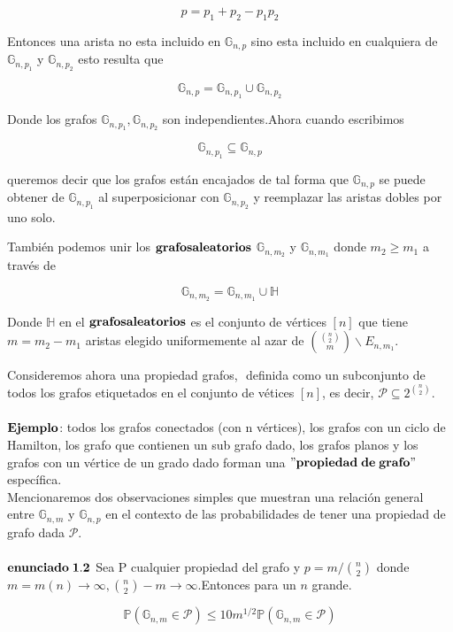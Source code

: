 \documentclass[11pt,a4paper]{article}
\begin{document}
  $$p= p_1 +p_2 -p_1p_2$$

Entonces una arista no esta incluido en $\mathbb{G}_{n,p}$ sino esta incluido en cualquiera de $\mathbb{G}_{n,p_1}$ y $\mathbb{G}_{n,p_2}$ esto resulta que

$$\mathbb{G}_{n,p} =\mathbb{G}_{n,p_1}\cup \mathbb{G}_{n,p_2}$$

Donde los grafos $\mathbb{G}_{n,p_1}, \mathbb{G}_{n,p_2}$ son independientes.Ahora cuando escribimos

$$\mathbb{G}_{n,p_1}\subseteq \mathbb{G}_{n,p}$$

queremos decir que los grafos est\'an encajados de tal forma que $\mathbb{G}_{n,p}$ se puede obtener de $\mathbb{G}_{n,p_1}$ al superposicionar con $\mathbb{G}_{n,p_2}$ y reemplazar las aristas dobles por uno solo.

Tambi\'en podemos unir los ${\bf grafos aleatorios}$ $\mathbb{G}_{n,m_2}$ y $\mathbb{G}_{n,m_1}$ donde $m_2 \geq  m_1$ a trav\'es de

 $$\mathbb{G}_{n,m_2} = \mathbb{G}_{n,m_1}\cup\mathbb{H} $$

Donde $\mathbb{H}$ en el ${\bf grafos aleatorios}$ es el conjunto de v\'ertices
 $[n]$ que tiene $m = m_2 - m_1$ aristas
elegido uniformemente al azar de $\binom {\binom {n}{2}}{m} \smallsetminus E_{n,m_1}$.

Consideremos ahora una propiedad grafos, $\mathcal{}$ definida como un subconjunto de todos los grafos etiquetados en el conjunto de v\'etices $[n]$, es decir, $ \mathcal{P}  \subseteq 2^{\binom {n}{2}}$. \\
\\
${\bf Ejemplo}$: todos los grafos conectados (con n v\'ertices), los grafos con un ciclo de Hamilton, los grafo que contienen un sub grafo dado, los grafos planos y los grafos con un v\'ertice de un grado dado forman una $"{\bf propiedad \;de\; grafo}"$ espec\'ifica.
\\

Mencionaremos dos observaciones simples que muestran una relaci\'on general entre $\mathbb{G}_{n,m}$ y $\mathbb{G}_{n,p}$ en el contexto de las probabilidades de tener una propiedad de grafo dada $ \mathcal{P}$.\\
\\
${\bf enunciado \; 1.2}$ Sea P cualquier propiedad del grafo y $ p = m / \binom {n}{2}$ donde $m=m(n) \longrightarrow \infty , \binom {n}{2} - m \longrightarrow \infty $.Entonces para un $n$ grande.

$$\mathbb{P}(\mathbb{G}_{n,m}\in \mathcal{P})\leq 10m^{1/2}\mathbb{P}(\mathbb{G}_{n,m}\in \mathcal{P})$$
\end{document}
